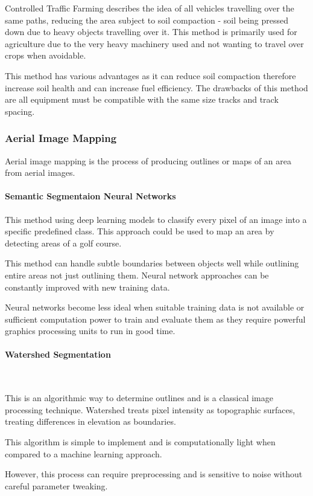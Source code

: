 \documentclass[final]{cmpreport_02}
\begin{document}
Controlled Traffic Farming describes the idea of all vehicles travelling over the same paths, reducing the area subject to soil compaction - soil being pressed down due to heavy objects travelling over it.
This method is primarily used for agriculture due to the very heavy machinery used and not wanting to travel over crops when avoidable.

This method has various advantages as it can reduce soil compaction therefore increase soil health and can increase fuel efficiency.
The drawbacks of this method are all equipment must be compatible with the same size tracks and track spacing.


\subsubsection{Aerial Image Mapping}
Aerial image mapping is the process of producing outlines or maps of an area from aerial images.

\paragraph{Semantic Segmentaion Neural Networks}
This method using deep learning models to classify every pixel of an image into a specific predefined class.
This approach could be used to map an area by detecting areas of a golf course.

This method can handle subtle boundaries between objects well while outlining entire areas not just outlining them.
Neural network approaches can be constantly improved with new training data.

Neural networks become less ideal when suitable training data is not available or sufficient computation power to train and evaluate them as they require powerful graphics processing units to run in good time.

\paragraph{Watershed Segmentation} \

This is an algorithmic way to determine outlines and is a classical image processing technique.
Watershed treats pixel intensity as topographic surfaces, treating differences in elevation as boundaries.

This algorithm is simple to implement and is computationally light when compared to a machine learning approach.

However, this process can require preprocessing and is sensitive to noise without careful parameter tweaking.
\end{document}
